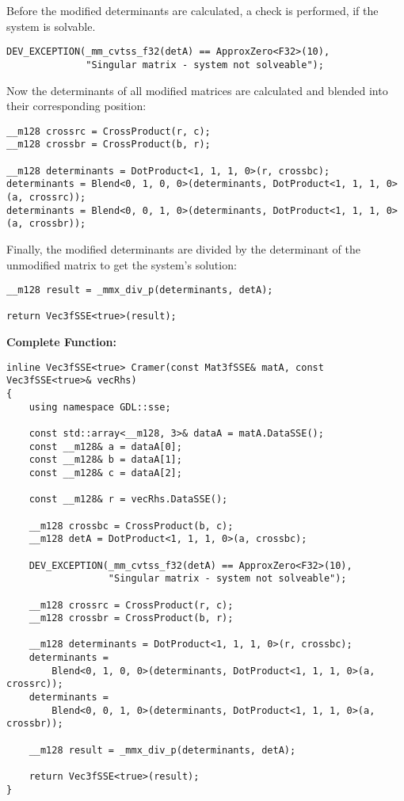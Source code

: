 Before the modified determinants are calculated, a check is performed, if the system is solvable.

\begin{verbatim}
DEV_EXCEPTION(_mm_cvtss_f32(detA) == ApproxZero<F32>(10), 
              "Singular matrix - system not solveable");
\end{verbatim}

Now the determinants of all modified matrices are calculated and blended into their corresponding position:

\begin{verbatim}
__m128 crossrc = CrossProduct(r, c);
__m128 crossbr = CrossProduct(b, r);

__m128 determinants = DotProduct<1, 1, 1, 0>(r, crossbc);
determinants = Blend<0, 1, 0, 0>(determinants, DotProduct<1, 1, 1, 0>(a, crossrc));
determinants = Blend<0, 0, 1, 0>(determinants, DotProduct<1, 1, 1, 0>(a, crossbr));
\end{verbatim}

Finally, the modified determinants are divided by the determinant of the unmodified matrix to get the system's solution:

\begin{verbatim}
__m128 result = _mmx_div_p(determinants, detA);

return Vec3fSSE<true>(result);
\end{verbatim}


\vspace{1cm}
\textbf{Complete Function:}

\begin{verbatim}
inline Vec3fSSE<true> Cramer(const Mat3fSSE& matA, const Vec3fSSE<true>& vecRhs)
{
    using namespace GDL::sse;

    const std::array<__m128, 3>& dataA = matA.DataSSE();
    const __m128& a = dataA[0];
    const __m128& b = dataA[1];
    const __m128& c = dataA[2];

    const __m128& r = vecRhs.DataSSE();

    __m128 crossbc = CrossProduct(b, c);
    __m128 detA = DotProduct<1, 1, 1, 0>(a, crossbc);

    DEV_EXCEPTION(_mm_cvtss_f32(detA) == ApproxZero<F32>(10), 
                  "Singular matrix - system not solveable");

    __m128 crossrc = CrossProduct(r, c);
    __m128 crossbr = CrossProduct(b, r);

    __m128 determinants = DotProduct<1, 1, 1, 0>(r, crossbc);
    determinants = 
        Blend<0, 1, 0, 0>(determinants, DotProduct<1, 1, 1, 0>(a, crossrc));
    determinants = 
        Blend<0, 0, 1, 0>(determinants, DotProduct<1, 1, 1, 0>(a, crossbr));

    __m128 result = _mmx_div_p(determinants, detA);

    return Vec3fSSE<true>(result);
}
\end{verbatim}



